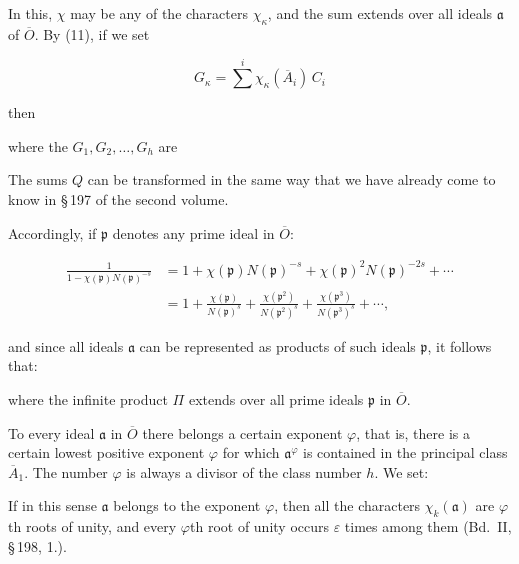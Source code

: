 
In this, $\chi$ may be any of the characters $\chi_\kappa$, and the sum extends over all ideals $\mathfrak{a}$ of $\overline{O}$. By (11), if we set

\[
G_\kappa = \sum^{i}\chi_\kappa(\overline{A}_i)\,C_i
\]

then


where the $G_1, G_2, \dots, G_h$ are 

The sums $Q$ can be transformed in the same way that we have already come to know in \S\,197 of the second volume.

Accordingly, if $\mathfrak{p}$ denotes any prime ideal in $\overline{O}$:

\[
\begin{aligned}
\frac{1}{1 - \chi(\mathfrak{p})N(\mathfrak{p})^{-s}} &= 1 + \chi(\mathfrak{p})N(\mathfrak{p})^{-s} + \chi(\mathfrak{p})^2 N(\mathfrak{p})^{-2s} + \cdots \\
&= 1 + \frac{\chi(\mathfrak{p})}{N(\mathfrak{p})^s} + \frac{\chi(\mathfrak{p}^2)}{N(\mathfrak{p}^2)^s} + \frac{\chi(\mathfrak{p}^3)}{N(\mathfrak{p}^3)^s} + \cdots,
\end{aligned}
\]

and since all ideals $\mathfrak{a}$ can be represented as products of such ideals $\mathfrak{p}$, it follows that:


where the infinite product $\Pi$ extends over all prime ideals $\mathfrak{p}$ in $\overline{O}$.

To every ideal $\mathfrak{a}$ in $\overline{O}$ there belongs a certain exponent $\varphi$, that is, there is a certain lowest positive exponent $\varphi$ for which $\mathfrak{a}^\varphi$ is contained in the principal class $\overline{A}_1$. The number $\varphi$ is always a divisor of the class number $h$. We set:


If in this sense $\mathfrak{a}$ belongs to the exponent $\varphi$, then all the characters $\chi_k(\mathfrak{a})$ are $\varphi$th roots of unity, and every $\varphi$th root of unity occurs $\varepsilon$ times among them (Bd.\ II, \S\,198, 1.).

